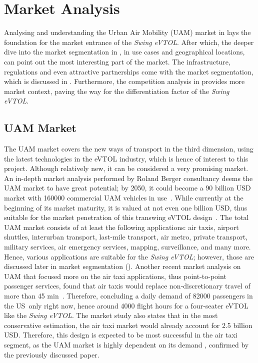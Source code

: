 \chapter{Market Analysis}
\label{ch:Market_Analysis}
Analysing and understanding the Urban Air Mobility (UAM) market in  lays the foundation for the market entrance of the \textit{Swing eVTOL}.
After which, the deeper dive into the market segmentation in , in use cases and geographical locations, can point out the most interesting part of the market.
The infrastructure, regulations and even attractive partnerships come with the market segmentation, which is discussed in .
Furthermore, the competition analysis in  provides more market context, paving the way for the differentiation factor of the \textit{Swing eVTOL}.

\section{UAM Market}
\label{sec:UAM_Market}
The UAM market covers the new ways of transport in the third dimension, using the latest technologies in the eVTOL industry, which is hence of interest to this project.
Although relatively new, it can be considered a very promising market.
An in-depth market analysis performed by Roland Berger consultancy deems the UAM market to have great potential; by 2050, it could become a 90 billion USD market with \num[exponent-mode=input]{160000} commercial UAM vehicles in use~\cite{potential90uam}.
While currently at the beginning of its market maturity, it is valued at not even one billion USD, thus suitable for the market penetration of this transwing eVTOL design~\cite{SAMUAM}.
The total UAM market consists of at least the following applications: air taxis, airport shuttles, interurban transport, last-mile transport, air metro, private transport, military services, air emergency services, mapping, surveillance, and many more.
Hence, various applications are suitable for the \textit{Swing eVTOL}; however, those are discussed later in market segmentation ().
Another recent market analysis on UAM that focused more on the air taxi applications, thus point-to-point passenger services, found that air taxis would replace non-discretionary travel of more than 45 min~\cite{goyal2021advanced}.
Therefore, concluding a daily demand of \num[exponent-mode=input]{82000} passengers in the US\ only right now, hence around 4000 flight hours for a four-seater eVTOL like the \textit{Swing eVTOL}.
The market study also states that in the most conservative estimation, the air taxi market would already account for 2.5 billion USD\@.
Therefore, this design is expected to be most successful in the air taxi segment, as the UAM market is highly dependent on its demand \cite{long2023demand}, confirmed by the previously discussed paper.

